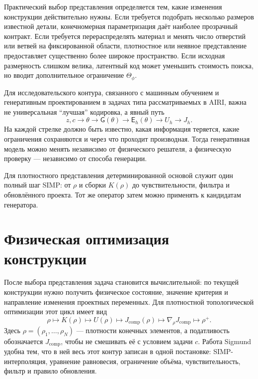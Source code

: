 Практический выбор представления определяется тем, какие изменения конструкции действительно нужны. Если требуется подобрать несколько размеров известной детали, конечномерная параметризация даёт наиболее прозрачный контракт. Если требуется перераспределять материал и менять число отверстий или ветвей на фиксированной области, плотностное или неявное представление предоставляет существенно более широкое пространство. Если исходная размерность слишком велика, латентный код может уменьшить стоимость поиска, но вводит дополнительное ограничение $\Theta_\phi$.

Для исследовательского контура, связанного с машинным обучением и генеративным проектированием в задачах типа рассматриваемых в AIRI, важна не универсальная ``лучшая'' кодировка, а явный путь
\begin{equation}
 z,c
 \longrightarrow
 \theta
 \longrightarrow
 \mathsf G(\theta)
 \longrightarrow
 \mathsf E_h(\theta)
 \longrightarrow
 U_h
 \longrightarrow
 J_h.
\end{equation}
На каждой стрелке должно быть известно, какая информация теряется, какие ограничения сохраняются и через что проходит производная. Тогда генеративная модель можно менять независимо от физического решателя, а физическую проверку --- независимо от способа генерации.

Для плотностного представления детерминированной основой служит один полный шаг SIMP: от $\rho$ и сборки $K(\rho)$ до чувствительности, фильтра и обновлённого проекта. Тот же оператор затем можно применять к кандидатам генератора.

\section{Физическая оптимизация конструкции}
\label{sec:physics-based-design-optimization}

После выбора представления задача становится вычислительной: по текущей конструкции нужно получить физическое состояние, значение критерия и направление изменения проектных переменных. Для плотностной топологической оптимизации этот цикл имеет вид
\begin{equation}
 \rho
 \longmapsto
 K(\rho)
 \longmapsto
 U(\rho)
 \longmapsto
 J_{\mathrm{comp}}(\rho)
 \longmapsto
 \nabla_\rho J_{\mathrm{comp}}
 \longmapsto
 \rho^+.
\end{equation}
Здесь $\rho=(\rho_1,\ldots,\rho_N)$ --- плотности конечных элементов, а податливость обозначается $J_{\mathrm{comp}}$, чтобы не смешивать её с условием задачи $c$. Работа Sigmund удобна тем, что в ней весь этот контур записан в одной постановке: SIMP-интерполяция, уравнение равновесия, ограничение объёма, чувствительность, фильтр и правило обновления.

